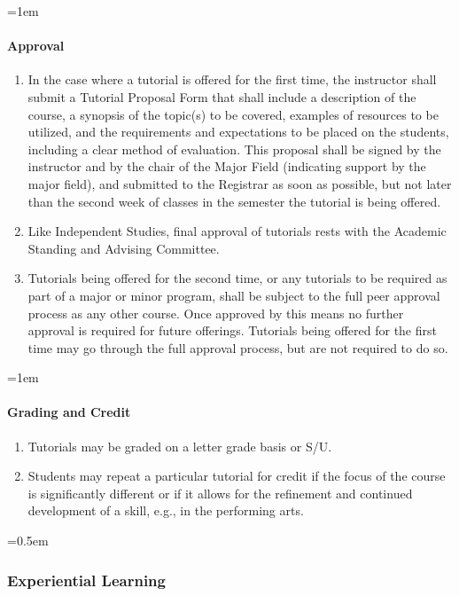 \documentclass{manual}
\let\oldsubsubsection\subsubsection
\renewcommand\subsubsection{\leftskip=0.5em\oldsubsubsection}
\let\oldparagraph\paragraph
\renewcommand\paragraph{\leftskip=1em\oldparagraph}
\newcommand{\itemLevelA}{\alph*.}
\newcommand{\itemRefA}{\alph*}
\begin{document}
\paragraph{Approval }

	\begin{enumerate}[label=\itemLevelA,ref=\itemRefA]
	\item In the case where a tutorial is offered for the first time, the instructor shall submit a Tutorial Proposal Form that shall include a description of the course, a synopsis of the topic(s) to be covered, examples of resources to be utilized, and the requirements and expectations to be placed on the students, including a clear method of evaluation.  This proposal shall be signed by the instructor and by the chair of the Major Field (indicating support by the major field), and submitted to the Registrar as soon as possible, but not later than the second week of classes in the semester the tutorial is being offered.  
	\item Like Independent Studies, final approval of tutorials rests with the Academic Standing and Advising Committee.
	\item Tutorials being offered for the second time, or any tutorials to be required as part of a major or minor program, shall be subject to the full peer approval process as any other course.  Once approved by this means no further approval is required for future offerings.  Tutorials being offered for the first time may go through the full approval process, but are not required to do so.
	\end{enumerate}

\paragraph{Grading and Credit}

	\begin{enumerate}[label=\itemLevelA,ref=\itemRefA]
	\item Tutorials may be graded on a letter grade basis or S/U.
	\item Students may repeat a particular tutorial for credit if the focus of the course is significantly different or if it allows for the refinement and continued development of a skill, e.g., in the performing arts.  
	\end{enumerate}

\subsubsection{Experiential Learning}
\end{document}
